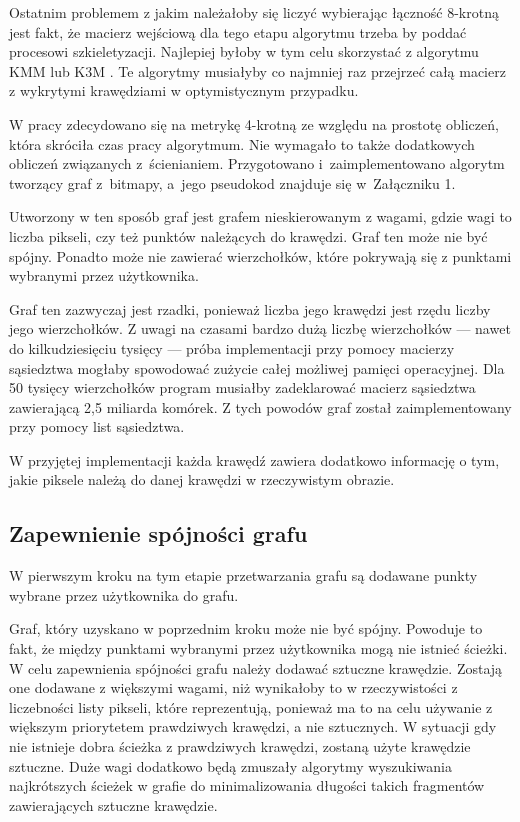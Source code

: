 \documentclass[a4paper,11pt,twoside,openright]{report}
\theoremstyle{definition}
\begin{document}
Ostatnim problemem z jakim należałoby się liczyć wybierając łączność 8-krotną
jest fakt, że macierz wejściową dla tego etapu algorytmu trzeba by poddać procesowi
szkieletyzacji. Najlepiej byłoby w tym celu skorzystać z algorytmu KMM \cite{KMM}
lub K3M \cite{K3M}. Te algorytmy musiałyby co najmniej raz przejrzeć całą macierz
z wykrytymi krawędziami w optymistycznym przypadku.

\bigskip

W pracy zdecydowano się na metrykę 4-krotną ze względu na prostotę obliczeń,
która skróciła czas pracy algorytmum. Nie wymagało to także dodatkowych 
obliczeń związanych z~ścienianiem. Przygotowano
i~zaimplementowano algorytm tworzący graf z~bitmapy, a~jego pseudokod znajduje
się w~Załączniku 1. %

Utworzony w ten sposób graf jest grafem nieskierowanym z wagami, gdzie wagi to
liczba pikseli, czy też punktów należących do krawędzi. Graf ten może nie być
spójny. Ponadto może nie zawierać wierzchołków, które pokrywają się z punktami
wybranymi przez użytkownika.

Graf ten zazwyczaj jest rzadki, ponieważ liczba jego krawędzi jest rzędu liczby
jego wierzchołków.  Z uwagi na czasami bardzo dużą liczbę wierzchołków --- nawet
do kilkudziesięciu tysięcy --- próba implementacji przy pomocy macierzy sąsiedztwa
mogłaby spowodować zużycie całej możliwej pamięci operacyjnej. Dla 50 tysięcy
wierzchołków program musiałby zadeklarować macierz sąsiedztwa zawierającą 2,5
miliarda komórek. Z tych powodów graf został zaimplementowany przy pomocy list sąsiedztwa.

W przyjętej implementacji każda krawędź zawiera dodatkowo informację o tym, jakie
piksele należą do danej krawędzi w rzeczywistym obrazie.

\subsection {Zapewnienie spójności grafu}

W pierwszym kroku na tym etapie przetwarzania grafu są dodawane punkty wybrane
przez użytkownika do grafu.

Graf, który uzyskano w poprzednim kroku może nie być spójny. Powoduje to fakt,
że między punktami wybranymi przez użytkownika mogą nie istnieć ścieżki. W celu
zapewnienia spójności grafu należy dodawać sztuczne krawędzie. Zostają one dodawane
z większymi wagami, niż wynikałoby to w rzeczywistości z liczebności listy pikseli,
które reprezentują, ponieważ ma to na celu używanie z większym priorytetem prawdziwych
krawędzi, a nie sztucznych. W sytuacji gdy nie istnieje dobra ścieżka z prawdziwych
krawędzi, zostaną użyte krawędzie sztuczne. Duże wagi dodatkowo będą zmuszały
algorytmy wyszukiwania najkrótszych ścieżek w grafie do minimalizowania długości
takich fragmentów zawierających sztuczne krawędzie.
\end{document}
